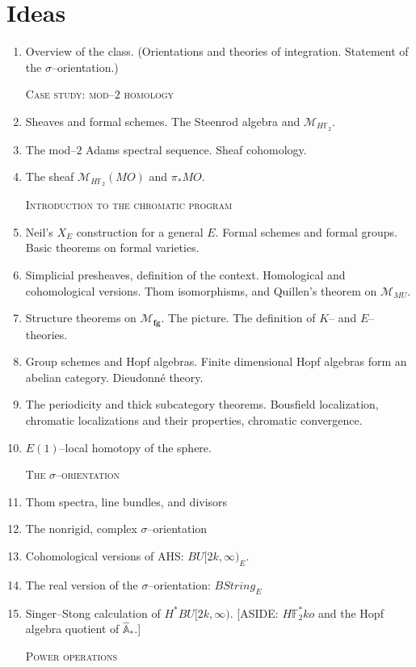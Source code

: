 \documentclass{amsart}
\newcommand{\F}{\mathbb F}
\newcommand{\A}{\widehat{\mathbb{A}}}
\newcommand{\<}{\langle}
\renewcommand{\>}{\rangle}
\newcommand{\context}[1]{\mathcal{M}_{#1}}
\newcommand{\moduli}[1]{\mathcal{M}_{\mathbf{#1}}}
\newcommand{\String}{\mathit{String}}
\newcommand{\MU}{\mathit{MU}}
\numberwithin{equation}{section}
\theoremstyle{plain}
\theoremstyle{definition}
\theoremstyle{remark}
\begin{document}
\section{Ideas}
\begin{enumerate}
\item Overview of the class. (Orientations and theories of integration. Statement of the $\sigma$--orientation.)

\textsc{Case study: mod--$2$ homology}
\item Sheaves and formal schemes. The Steenrod algebra and $\context{H\F_2}$.
\item The mod--$2$ Adams spectral sequence. Sheaf cohomology. 
\item The sheaf $\context{H\F_2}(MO)$ and $\pi_* MO$.

\textsc{Introduction to the chromatic program}

\item Neil's $X_E$ construction for a general $E$. Formal schemes and formal groups. Basic theorems on formal varieties.
\item Simplicial presheaves, definition of the context. Homological and cohomological versions. Thom isomorphisms, and Quillen's theorem on $\context{\MU}$.
\item Structure theorems on $\moduli{fg}$. The picture. The definition of $K$-- and $E$--theories.
\item Group schemes and Hopf algebras. Finite dimensional Hopf algebras form an abelian category. Dieudonn\'e theory.
\item The periodicity and thick subcategory theorems. Bousfield localization, chromatic localizations and their properties, chromatic convergence.
\item $E(1)$--local homotopy of the sphere.

\textsc{The $\sigma$--orientation}

\item Thom spectra, line bundles, and divisors
\item The nonrigid, complex $\sigma$--orientation
\item Cohomological versions of AHS: $BU[2k, \infty)_E$.
\item The real version of the $\sigma$--orientation: $B\String_E$
\item Singer--Stong calculation of $H^* BU[2k, \infty)$. [ASIDE: $H\F_2^* ko$ and the Hopf algebra quotient of $\A_*$.]

\textsc{Power operations}


\end{enumerate}
\end{document}
